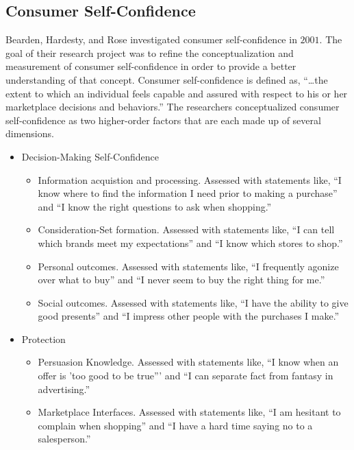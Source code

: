 \subsection{Consumer Self-Confidence}

Bearden, Hardesty, and Rose investigated consumer self-confidence in $ 2001 $\cite{bearden2001consumer}. The goal of their research project was to refine the conceptualization and measurement of consumer self-confidence in order to provide a better understanding of that concept. Consumer self-confidence is defined as, ``\ldots the extent to which an individual feels capable and assured with respect to his or her marketplace decisions and behaviors.'' The researchers conceptualized consumer self-confidence as two higher-order factors that are each made up of several dimensions.

\begin{itemize}
	\item Decision-Making Self-Confidence
	\begin{itemize}
		\item Information acquistion and processing. Assessed with statements like, ``I know where to find the information I need prior to making a purchase'' and ``I know the right questions to ask when shopping.''
		\item Consideration-Set formation. Assessed with statements like, ``I can tell which brands meet my expectations'' and ``I know which stores to shop.''
		\item Personal outcomes. Assessed with statements like, ``I frequently agonize over what to buy'' and ``I never seem to buy the right thing for me.''
		\item Social outcomes. Assessed with statements like, ``I have the ability to give good presents'' and ``I impress other people with the purchases I make.''
	\end{itemize}
	\item Protection
	\begin{itemize}
		\item Persuasion Knowledge. Assessed with statements like, ``I know when an offer is 'too good to be true''' and ``I can separate fact from fantasy in advertising.''
		\item Marketplace Interfaces. Assessed with statements like, ``I am hesitant to complain when shopping'' and ``I have a hard time saying no to a salesperson.''
	\end{itemize}
\end{itemize}

